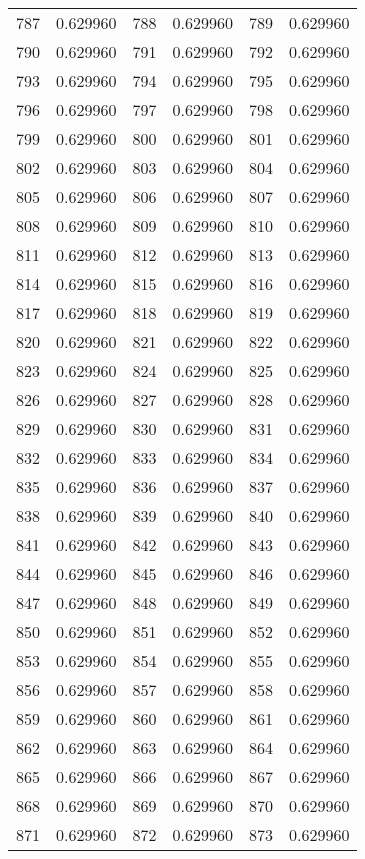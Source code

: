 \documentclass[12pt]{article}
\begin{document}
\begin{longtable}{@{}cc|cc|cc@{}}
787 & 0.629960 & 788 & 0.629960 & 789 & 0.629960 \\
790 & 0.629960 & 791 & 0.629960 & 792 & 0.629960 \\
793 & 0.629960 & 794 & 0.629960 & 795 & 0.629960 \\
796 & 0.629960 & 797 & 0.629960 & 798 & 0.629960 \\
799 & 0.629960 & 800 & 0.629960 & 801 & 0.629960 \\
802 & 0.629960 & 803 & 0.629960 & 804 & 0.629960 \\
805 & 0.629960 & 806 & 0.629960 & 807 & 0.629960 \\
808 & 0.629960 & 809 & 0.629960 & 810 & 0.629960 \\
811 & 0.629960 & 812 & 0.629960 & 813 & 0.629960 \\
814 & 0.629960 & 815 & 0.629960 & 816 & 0.629960 \\
817 & 0.629960 & 818 & 0.629960 & 819 & 0.629960 \\
820 & 0.629960 & 821 & 0.629960 & 822 & 0.629960 \\
823 & 0.629960 & 824 & 0.629960 & 825 & 0.629960 \\
826 & 0.629960 & 827 & 0.629960 & 828 & 0.629960 \\
829 & 0.629960 & 830 & 0.629960 & 831 & 0.629960 \\
832 & 0.629960 & 833 & 0.629960 & 834 & 0.629960 \\
835 & 0.629960 & 836 & 0.629960 & 837 & 0.629960 \\
838 & 0.629960 & 839 & 0.629960 & 840 & 0.629960 \\
841 & 0.629960 & 842 & 0.629960 & 843 & 0.629960 \\
844 & 0.629960 & 845 & 0.629960 & 846 & 0.629960 \\
847 & 0.629960 & 848 & 0.629960 & 849 & 0.629960 \\
850 & 0.629960 & 851 & 0.629960 & 852 & 0.629960 \\
853 & 0.629960 & 854 & 0.629960 & 855 & 0.629960 \\
856 & 0.629960 & 857 & 0.629960 & 858 & 0.629960 \\
859 & 0.629960 & 860 & 0.629960 & 861 & 0.629960 \\
862 & 0.629960 & 863 & 0.629960 & 864 & 0.629960 \\
865 & 0.629960 & 866 & 0.629960 & 867 & 0.629960 \\
868 & 0.629960 & 869 & 0.629960 & 870 & 0.629960 \\
871 & 0.629960 & 872 & 0.629960 & 873 & 0.629960 \\

\end{longtable}
\end{document}
